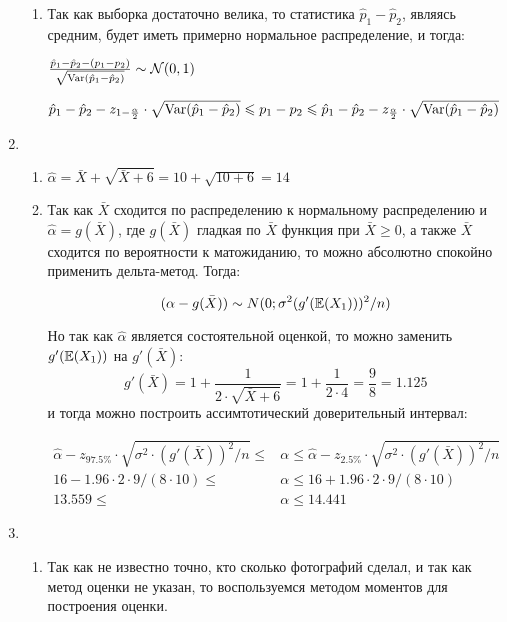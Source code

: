 \begin{enumerate}
\begin{enumerate}
\item Так как выборка достаточно велика, то статистика $\hat{p}_{1}-\hat{p}_{2}$,
являясь средним, будет иметь примерно нормальное распределение, и тогда:

$\frac{\hat{p}_{1}-\hat{p}_{2}-(p_{1}-p_{2})}{\sqrt{\operatorname{Var}(\hat{p}_{1}-\hat{p}_{2})}}\sim \mathcal{N}(0,1)$

$\hat{p}_{1}-\hat{p}_{2}-z_{1-\frac{\alpha}{2}}\cdot\sqrt{\operatorname{Var}(\hat{p}_{1}-\hat{p}_{2})} \leqslant p_{1}-p_{2} \leqslant \hat{p}_{1}-\hat{p}_{2}-z_{\frac{\alpha}{2}}\cdot\sqrt{\operatorname{Var}(\hat{p}_{1}-\hat{p}_{2})}$
\end{enumerate}
\item \begin{enumerate}
\item $\hat{\alpha}=\bar{X}+\sqrt{\bar{X}+6}=10+\sqrt{10+6}=14$

\item Так как $\bar{X}$ сходится по распределению к нормальному распределению и $\hat{\alpha}=g(\bar{X})$, где $g(\bar{X})$ гладкая по $\bar{X}$ функция при $\bar{X}\ge0$, а также $\bar{X}$ сходится по вероятности к матожиданию, то можно абсолютно спокойно применить дельта-метод. Тогда:

\[
(\alpha-g(\bar{X}))\sim N(0;\sigma^{2}(g'(\operatorname{\mathbb{E}}(X_{1})))^{2}/n)
\]

Но так как $\hat{\alpha}$ является состоятельной оценкой, то можно заменить $g'(\operatorname{\mathbb{E}}(X_{1}))$ на $g'(\bar{X})$:
\[
g'(\bar{X})=1+\frac{1}{2\cdot\sqrt{\bar{X}+6}}=1+\frac{1}{2\cdot4}=\frac{9}{8}=1.125
\]
и тогда можно построить ассимтотический доверительный интервал:

\begin{align*}
\hat{\alpha}-z_{97.5\%}\cdot\sqrt{\sigma^{2}\cdot(g'(\bar{X}))^{2}/n}\le &\alpha \le
\hat{\alpha}-z_{2.5\%}\cdot\sqrt{\sigma^{2}\cdot(g'(\bar{X}))^{2}/n} \\
16-1.96\cdot2\cdot9/(8\cdot10)\le&\alpha\le 16+1.96\cdot2\cdot9/(8\cdot10) \\
13.559\le&\alpha\le 14.441
\end{align*}
\end{enumerate}
\item \begin{enumerate}
\item Так как не известно точно, кто сколько фотографий сделал, и так как метод оценки не указан,
то воспользуемся методом моментов для построения оценки.


\end{enumerate}
\end{enumerate}
